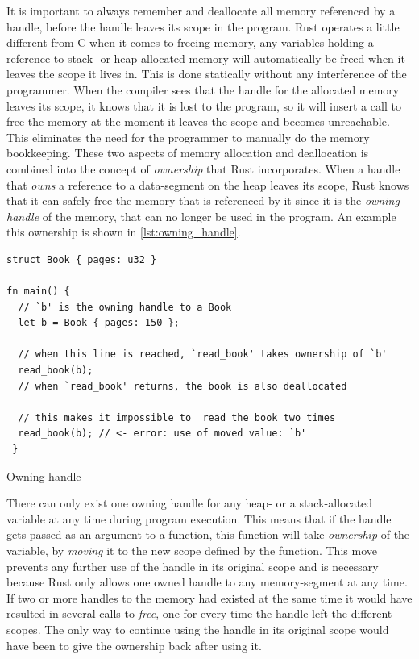 It is important to always remember and deallocate all memory referenced by a handle, before the handle leaves its scope in the program.
Rust operates a little different from C when it comes to freeing memory, any variables holding a reference to stack- or heap-allocated memory will automatically be freed when it leaves the scope it lives in.
This is done statically without any interference of the programmer.
When the compiler sees that the handle for the allocated memory leaves its scope, it knows that it is lost to the program, so it will insert a call to free the memory at the moment it leaves the scope and becomes unreachable.
This eliminates the need for the programmer to manually do the memory bookkeeping.
These two aspects of memory allocation and deallocation is combined into the concept of \emph{ownership} that Rust incorporates.
When a handle that \emph{owns} a reference to a data-segment on the heap leaves its scope, Rust knows that it can safely free the memory that is referenced by it since it is the \emph{owning handle} of the memory, that can no longer be used in the program.
An example this ownership is shown in \autoref{lst:owning_handle}.

\begin{listing}[tb]
\begin{verbatim}
struct Book { pages: u32 }

fn main() {
  // `b' is the owning handle to a Book
  let b = Book { pages: 150 };

  // when this line is reached, `read_book' takes ownership of `b'
  read_book(b);
  // when `read_book' returns, the book is also deallocated

  // this makes it impossible to  read the book two times
  read_book(b); // <- error: use of moved value: `b'
 }
\end{verbatim}
\caption{Owning handle}
\label{lst:owning_handle}
\end{listing}

There can only exist one owning handle for any heap- or a stack-allocated variable at any time during program execution.
This means that if the handle gets passed as an argument to a function, this function will take \emph{ownership} of the variable, by \emph{moving} it to the new scope defined by the function.
This move prevents any further use of the handle in its original scope and is necessary because Rust only allows one owned handle to any memory-segment at any time.
If two or more handles to the memory had existed at the same time it would have resulted in several calls to \emph{free}, one for every time the handle left the different scopes.
The only way to continue using the handle in its original scope would have been to give the ownership back after using it.

